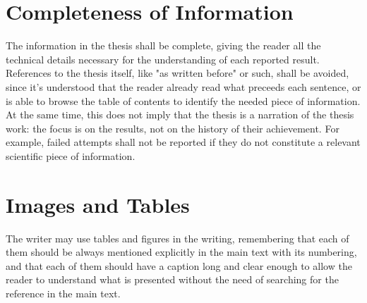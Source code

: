 \section{Completeness of Information}

The information in the thesis shall be complete,
giving the reader all the technical details necessary for the understanding of each reported result.
References to the thesis itself, like "as written before" or such, shall be avoided,
since it's understood that the reader already read what preceeds each sentence,
or is able to browse the table of contents to identify the needed piece of information.
\newline{}
At the same time,
this does not imply that the thesis is a narration of the thesis work:
the focus is on the results, not on the history of their achievement.
For example,
failed attempts shall not be reported if they do not constitute a relevant scientific piece of information.


\section{Images and Tables}

The writer may use tables and figures in the writing,
remembering that each of them should be always mentioned explicitly in the main text with its numbering,
and that each of them should have a caption long and clear enough 
to allow the reader to understand what is presented 
without the need of searching for the reference in the main text.
